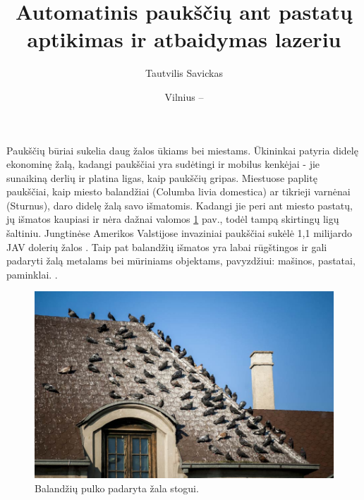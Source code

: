 \documentclass{VUMIFPSkursinis}
\title{Automatinis paukščių ant pastatų aptikimas ir atbaidymas lazeriu}
\author{Tautvilis Savickas}
\date{Vilnius – \the\year}
\begin{document}
\maketitle

\tableofcontents


Paukščių būriai sukelia daug žalos ūkiams bei miestams. Ūkininkai patyria didelę ekonominę žalą, kadangi paukščiai yra sudėtingi ir  mobilus kenkėjai - jie sunaikiną derlių \cite{refId0} ir platina ligas, kaip paukščių gripas. Miestuose paplitę paukščiai, kaip miesto balandžiai (Columba livia domestica) ar tikrieji varnėnai (Sturnus), daro didelę žalą savo išmatomis. Kadangi jie peri ant miesto pastatų, jų išmatos kaupiasi ir nėra dažnai valomos \ref{img:bird_poop} pav., todėl tampą skirtingų ligų šaltiniu. Jungtinėse Amerikos Valstijose invaziniai paukščiai sukėlė 1,1 milijardo JAV dolerių žalos \cite{article}. Taip pat balandžių išmatos yra labai rūgštingos ir gali padaryti žalą metalams bei mūriniams objektams, pavyzdžiui: mašinos, pastatai, paminklai. \cite{ahmed2021effect, shrestha2022conservation}.

\begin{figure}[H]
    \centering
    \includegraphics[scale=0.5]{img/bird_poop_on_roof.png}
    \caption{Balandžių pulko padaryta žala stogui.}
    \label{img:bird_poop}
\end{figure}
\end{document}
